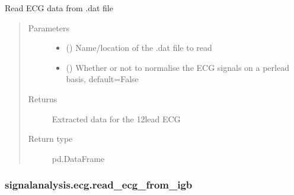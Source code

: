 \documentclass[letterpaper,10pt,english]{sphinxmanual}
\begin{document}
\begin{fulllineitems}
\label{\detokenize{_autosummary/signalanalysis.ecg.read_ecg_from_dat:signalanalysis.ecg.read_ecg_from_dat}}
\sphinxAtStartPar
Read ECG data from .dat file
\begin{quote}\begin{description}
\item[{Parameters}] \leavevmode\begin{itemize}
\item {} 
\sphinxAtStartPar
{} () \textendash{} Name/location of the .dat file to read

\item {} 
\sphinxAtStartPar
{} (\sphinxstyleliteralemphasis{\sphinxupquote{, }}) \textendash{} Whether or not to normalise the ECG signals on a per\sphinxhyphen{}lead basis, default=False

\end{itemize}

\item[{Returns}] \leavevmode
\sphinxAtStartPar
{} \textendash{} Extracted data for the 12\sphinxhyphen{}lead ECG

\item[{Return type}] \leavevmode
\sphinxAtStartPar
pd.DataFrame

\end{description}\end{quote}

\end{fulllineitems}



\subsubsection{signalanalysis.ecg.read\_ecg\_from\_igb}
\label{\detokenize{_autosummary/signalanalysis.ecg.read_ecg_from_igb:signalanalysis-ecg-read-ecg-from-igb}}\label{\detokenize{_autosummary/signalanalysis.ecg.read_ecg_from_igb::doc}}
\end{document}
